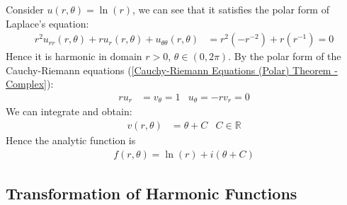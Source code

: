 \documentclass[12pt, english]{book}
\begin{document}
	\begin{example}
		{\color{Grey}
		Consider \(u(r, \theta) = \ln(r)\), we can see that it satisfies the polar form of Laplace's equation:
		\begin{align*}
			r^2 u_{rr}(r, \theta) + ru_r(r, \theta) + u_{\theta \theta}(r,\theta) 
			&= r^2 (-r^{-2}) + r(r^{-1}) = 0
		\end{align*}
		Hence it is harmonic in domain \(r>0\), \(\theta \in (0,2\pi)\). By the polar form of the Cauchy-Riemann equations (\cref{Cauchy-Riemann Equations (Polar) Theorem - Complex}):
		\begin{align*}
			r u_r &= v_\theta = 1 & u_\theta = -rv_r = 0
		\end{align*}
		We can integrate and obtain:
		\begin{align*}
			v(r,\theta) &= \theta + C & C \in \mathbb{R}
		\end{align*}
		Hence the analytic function is
		\begin{align*}
			f(r, \theta) = \ln(r) + i(\theta + C)
		\end{align*}
		}	
	\end{example}
	
	\subsection{Transformation of Harmonic Functions} \label{Transformation of Harmonic Functions Subsection - Complex}
	
\end{document}
